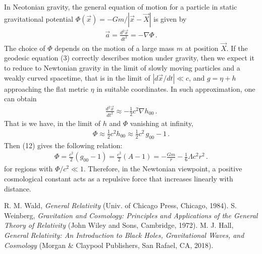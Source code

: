 \documentclass[11pt, onesided]{book}
\theoremstyle{break}
\theoremstyle{break}
\begin{document}
In Neotonian gravity, the general equation of motion for a particle in static gravitational potential $\Phi(\vec{x}) = -Gm/|\vec{x} - \vec{X}|$ is given by
\begin{align*}
\vec{a} = \frac{d^2 \vec{x}}{dt^2} = -\nabla \Phi\,.
\end{align*}
The choice of $\Phi$ depends on the motion of a large mass $m$ at position $\vec{X}$. If the geodesic equation (3) correctly describes motion under gravity, then we expect it to reduce to Newtonian gravity in the limit of slowly moving particles and a weakly curved spacetime, that is in the limit of $|d\vec{x}/dt|\ll c$, and $g = \eta + h$ approaching the flat metric $\eta$ in suitable coordinates. In such approximation, one can obtain \cite{Hall}
\begin{align*}
\frac{d^2 \vec{x}}{dt^2} \approx -\frac{1}{2}c^2 \nabla h_{00}\,.
\end{align*}
That is we have, in the limit of $h$ and $\Phi$ vanishing at infinity,
\begin{align*}
\Phi \approx \frac{1}{2}c^2 h_{00} \approx \frac{1}{2}c^2 \, g_{00} -1\,.
\end{align*}
Then (12) gives the following relation:
\begin{align*}
\Phi = \frac{c^2}{2}(g_{00} -1) = \frac{c^2}{2}(A - 1) = -\frac{Gm}{r} - \frac{1}{6}\Lambda c^2 r^2\,.
\end{align*}
for regions with $\Phi/c^2 \ll 1$. Therefore, in the Newtonian viewpoint, a positive cosmological constant acts as a repulsive force that increases linearly with distance. 


\begin{thebibliography}{9}
R. M. Wald, \textit{General Relativity} (Univ. of Chicago Press, Chicago, 1984). 
S. Weinberg, \textit{Gravitation and Cosmology: Principles and Applications of the General Theory of Relativity} (John Wiley and Sons, Cambridge, 1972). 
M. J. Hall, \textit{General Relativity: An Introduction to Black Holes, Gravitational Waves, and Cosmology }(Morgan \& Claypool Publishers, San Rafael, CA, 2018).  
\end{thebibliography}
\end{document}
